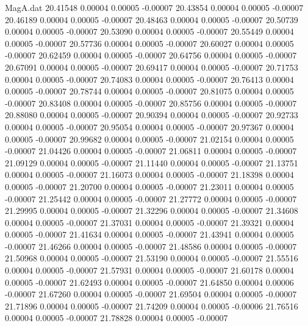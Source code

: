 \begin{filecontents}{MagA.dat}
  20.41548    0.00004    0.00005   -0.00007
  20.43854    0.00004    0.00005   -0.00007
  20.46189    0.00004    0.00005   -0.00007
  20.48463    0.00004    0.00005   -0.00007
  20.50739    0.00004    0.00005   -0.00007
  20.53090    0.00004    0.00005   -0.00007
  20.55449    0.00004    0.00005   -0.00007
  20.57736    0.00004    0.00005   -0.00007
  20.60027    0.00004    0.00005   -0.00007
  20.62459    0.00004    0.00005   -0.00007
  20.64756    0.00004    0.00005   -0.00007
  20.67091    0.00004    0.00005   -0.00007
  20.69417    0.00004    0.00005   -0.00007
  20.71753    0.00004    0.00005   -0.00007
  20.74083    0.00004    0.00005   -0.00007
  20.76413    0.00004    0.00005   -0.00007
  20.78744    0.00004    0.00005   -0.00007
  20.81075    0.00004    0.00005   -0.00007
  20.83408    0.00004    0.00005   -0.00007
  20.85756    0.00004    0.00005   -0.00007
  20.88080    0.00004    0.00005   -0.00007
  20.90394    0.00004    0.00005   -0.00007
  20.92733    0.00004    0.00005   -0.00007
  20.95054    0.00004    0.00005   -0.00007
  20.97367    0.00004    0.00005   -0.00007
  20.99682    0.00004    0.00005   -0.00007
  21.02154    0.00004    0.00005   -0.00007
  21.04426    0.00004    0.00005   -0.00007
  21.06811    0.00004    0.00005   -0.00007
  21.09129    0.00004    0.00005   -0.00007
  21.11440    0.00004    0.00005   -0.00007
  21.13751    0.00004    0.00005   -0.00007
  21.16073    0.00004    0.00005   -0.00007
  21.18398    0.00004    0.00005   -0.00007
  21.20700    0.00004    0.00005   -0.00007
  21.23011    0.00004    0.00005   -0.00007
  21.25442    0.00004    0.00005   -0.00007
  21.27772    0.00004    0.00005   -0.00007
  21.29995    0.00004    0.00005   -0.00007
  21.32296    0.00004    0.00005   -0.00007
  21.34608    0.00004    0.00005   -0.00007
  21.37031    0.00004    0.00005   -0.00007
  21.39321    0.00004    0.00005   -0.00007
  21.41634    0.00004    0.00005   -0.00007
  21.43941    0.00004    0.00005   -0.00007
  21.46266    0.00004    0.00005   -0.00007
  21.48586    0.00004    0.00005   -0.00007
  21.50968    0.00004    0.00005   -0.00007
  21.53190    0.00004    0.00005   -0.00007
  21.55516    0.00004    0.00005   -0.00007
  21.57931    0.00004    0.00005   -0.00007
  21.60178    0.00004    0.00005   -0.00007
  21.62493    0.00004    0.00005   -0.00007
  21.64850    0.00004    0.00006   -0.00007
  21.67260    0.00004    0.00005   -0.00007
  21.69504    0.00004    0.00005   -0.00007
  21.71896    0.00004    0.00005   -0.00007
  21.74209    0.00004    0.00005   -0.00006
  21.76516    0.00004    0.00005   -0.00007
  21.78828    0.00004    0.00005   -0.00007

\end{filecontents}

